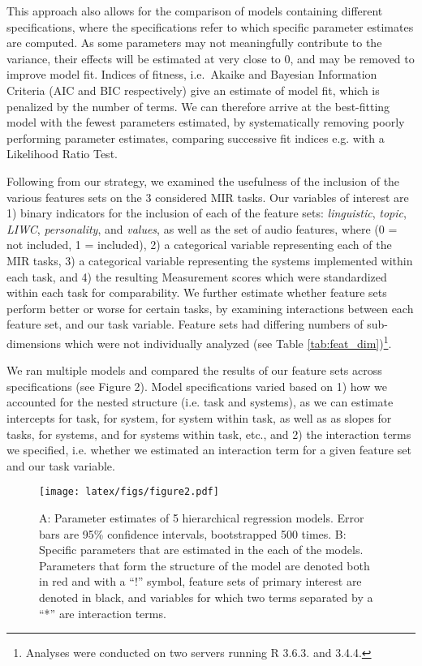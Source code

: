 \documentclass{article}
\begin{document}
This approach also allows for the comparison of models containing different specifications, where the specifications refer to which specific parameter estimates are computed. As some parameters may not meaningfully contribute to the variance, their effects will be estimated at very close to 0, and may be removed to improve model fit. Indices of fitness, i.e.\ Akaike and Bayesian Information Criteria (AIC and BIC respectively) give an estimate of model fit, which is penalized by the number of terms. We can therefore arrive at the best-fitting model with the fewest parameters estimated, by systematically removing poorly performing parameter estimates, comparing successive fit indices e.g. with a Likelihood Ratio Test. 

Following from our strategy, we examined the usefulness of the inclusion of the various features sets on the 3 considered MIR tasks. Our variables of interest are 1) binary indicators for the inclusion of each of the feature sets: \emph{linguistic}, \emph{topic}, \emph{LIWC}, \emph{personality}, and \emph{values}, as well as the set of audio features, where (0 = not included, 1 = included), 2) a categorical variable representing each of the MIR tasks, 3) a categorical variable representing the systems implemented within each task, and 4) the resulting Measurement scores which were standardized within each task for comparability. We further estimate whether feature sets perform better or worse for certain tasks, by examining interactions between each feature set, and our task variable. Feature sets had differing numbers of sub-dimensions which were not individually analyzed (see Table \ref{tab:feat_dim})\footnote{Analyses were conducted on two servers running R 3.6.3. and 3.4.4.}.

We ran multiple models and compared the results of our feature sets across specifications (see Figure 2). Model specifications varied based on 1) how we accounted for the nested structure (i.e. task and systems), as we can estimate intercepts for task, for system, for system within task, as well as as slopes for tasks, for systems, and for systems within task, etc., and 2) the interaction terms we specified, i.e. whether we estimated an interaction term for a given feature set and our task variable. 
\begin{figure}
    \centering
    \texttt{[image: latex/figs/figure2.pdf]}
    \caption{A: Parameter estimates of 5 hierarchical regression models. Error bars are 95\% confidence intervals, bootstrapped 500 times. B: Specific parameters that are estimated in the each of the models. Parameters that form the structure of the model are denoted both in red and with a ``!'' symbol, feature sets of primary interest are denoted in black, and variables for which two terms separated by a ``*'' are interaction terms.}
    \label{fig:parameterestimates}
\end{figure}
\end{document}
